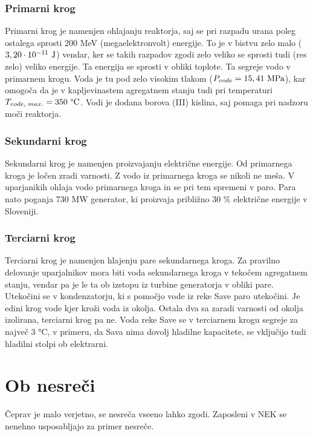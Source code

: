\documentclass[a4paper,12pt]{article}
\begin{document}
\subsubsection{Primarni krog}
Primarni krog je namenjen ohlajanju reaktorja, saj se pri razpadu urana poleg ostalega sprosti 200 MeV (megaelektronvolt) energije. To je v bistvu zelo malo ($3,20 \cdot 10^{-11} \textnormal{ J}$) vendar, ker se takih razpadov zgodi zelo veliko se sprosti tudi (res zelo) veliko energije. Ta energija se sprosti v obliki toplote. Ta segreje vodo v primarnem krogu. Voda je tu pod zelo visokim tlakom ($P_{vode} = 15,41 \textnormal{ MPa}$), kar omogoča da je v kapljevinastem agregatnem stanju tudi pri temperaturi $T_{vode, \textnormal{ } max.} = 350 \textnormal{ °C}$. Vodi je dodana borova (III) kislina, saj pomaga pri nadzoru moči reaktorja.
\subsubsection{Sekundarni krog}
Sekundarni krog je namenjen proizvajanju električne energije. Od primarnega kroga je ločen zradi varnosti. Z vodo iz primarnega kroga se nikoli ne meša. V uparjanikih ohlaja vodo primarnega kroga in se pri tem spremeni v paro. Para nato poganja 730 MW generator, ki proizvaja približno 30 \% električne energije v Sloveniji.
\subsubsection{Terciarni krog}
Terciarni krog je namenjen hlajenju pare sekundarnega kroga. Za pravilno delovanje uparjalnikov mora biti voda sekundarnega kroga v tekočem agregatnem stanju, vendar pa je le ta ob izstopu iz turbine generatorja v obliki pare. Utekočini se v kondenzatorju, ki s pomočjo vode iz reke Save paro utekočini. Je edini krog vode kjer kroži voda iz okolja. Ostala dva sa zaradi varnosti od okolja izolirana, terciarni krog pa ne. Voda reke Save se v terciarnem krogu segreje za največ 3 °C, v primeru, da Sava nima dovolj hladilne kapacitete, se vključijo tudi hladilni stolpi ob elektrarni.
\newpage
\section{Ob nesreči}
Čeprav je malo verjetno, se nesreča vseeno lahko zgodi. Zaposleni v NEK se nenehno usposabljajo za primer nesreče.
\end{document}
